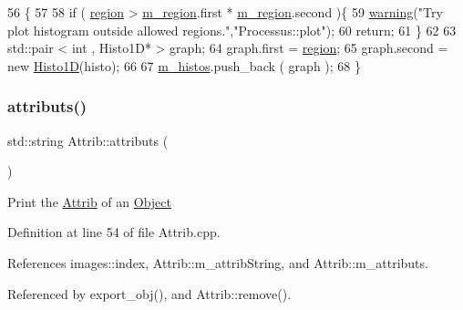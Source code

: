 \begin{DoxyCode}
56                                        \{
57   
58   \textcolor{keywordflow}{if} ( \hyperlink{classPlot_ae493b21749049d75cbb7282b1e1b9ab4}{region} > \hyperlink{classPlot_aabcbba1cfc66babcbcd647fdf90cdbf1}{m\_region}.first * \hyperlink{classPlot_aabcbba1cfc66babcbcd647fdf90cdbf1}{m\_region}.second )\{
59     \hyperlink{classObject_a65cd4fda577711660821fd2cd5a3b4c9}{warning}(\textcolor{stringliteral}{"Try plot histogram outside allowed regions."},\textcolor{stringliteral}{"Processus::plot"});
60     \textcolor{keywordflow}{return};
61   \}
62 
63   std::pair < int , Histo1D* > graph;
64   graph.first = \hyperlink{classPlot_ae493b21749049d75cbb7282b1e1b9ab4}{region};
65   graph.second = \textcolor{keyword}{new} \hyperlink{classHisto1D}{Histo1D}(histo);
66 
67   \hyperlink{classPlot_a7edebf2b275223b8ce55f6ef3b2da0cc}{m\_histos}.push\_back ( graph );  
68 \}
\end{DoxyCode}
\mbox{\label{classAttrib_aee7bbf16b144887f196e1341b24f8a26}} 
\subsubsection{\texorpdfstring{attributs()}{attributs()}}
{\footnotesize\ttfamily std\+::string Attrib\+::attributs (\begin{DoxyParamCaption}{ }\end{DoxyParamCaption})\hspace{0.3cm}{\ttfamily [inherited]}}

Print the \hyperlink{classAttrib}{Attrib} of an \hyperlink{classObject}{Object} 

Definition at line 54 of file Attrib.\+cpp.



References images\+::index, Attrib\+::m\+\_\+attrib\+String, and Attrib\+::m\+\_\+attributs.



Referenced by export\+\_\+obj(), and Attrib\+::remove().


